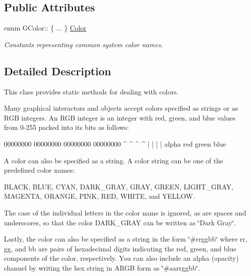 \subsection*{Public Attributes}
\begin{DoxyCompactItemize}
\item 
enum G\+Color\+:: \{ ... \}  \mbox{\hyperlink{classGColor_a829e668b6af432af22e4fe68feff8c9a}{Color}}
\begin{DoxyCompactList}\small\item\em Constants representing common system color names. \end{DoxyCompactList}\end{DoxyCompactItemize}


\subsection{Detailed Description}
This class provides static methods for dealing with colors. 

Many graphical interactors and objects accept colors specified as strings or as R\+GB integers. An R\+GB integer is an integer with red, green, and blue values from 0-\/255 packed into its bits as follows\+:


\begin{DoxyPre}
00000000 00000000 00000000 00000000
   ^        ^        ^        ^
   |        |        |        |
 alpha     red     green     blue
\end{DoxyPre}


A color can also be specified as a string. A color string can be one of the predefined color names\+:

{\ttfamily B\+L\+A\+CK}, {\ttfamily B\+L\+UE}, {\ttfamily C\+Y\+AN}, {\ttfamily D\+A\+R\+K\+\_\+\+G\+R\+AY}, {\ttfamily G\+R\+AY}, {\ttfamily G\+R\+E\+EN}, {\ttfamily L\+I\+G\+H\+T\+\_\+\+G\+R\+AY}, {\ttfamily M\+A\+G\+E\+N\+TA}, {\ttfamily O\+R\+A\+N\+GE}, {\ttfamily P\+I\+NK}, {\ttfamily R\+ED}, {\ttfamily W\+H\+I\+TE}, and {\ttfamily Y\+E\+L\+L\+OW}.

The case of the individual letters in the color name is ignored, as are spaces and underscores, so that the color {\ttfamily D\+A\+R\+K\+\_\+\+G\+R\+AY} can be written as {\ttfamily \char`\"{}\+Dark Gray\char`\"{}}.

Lastly, the color can also be specified as a string in the form {\ttfamily \char`\"{}\#rrggbb\char`\"{}} where {\ttfamily rr}, {\ttfamily gg}, and {\ttfamily bb} are pairs of hexadecimal digits indicating the red, green, and blue components of the color, respectively. You can also include an alpha (opacity) channel by writing the hex string in A\+R\+GB form as {\ttfamily \char`\"{}\#aarrggbb\char`\"{}}. 

